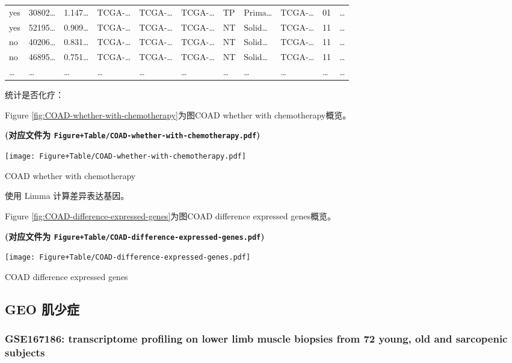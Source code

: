 \documentclass[
]{article}
\begin{document}
\begin{longtable}[]{@{}lllllllllll@{}}
yes & 30802\ldots{} & 1.147\ldots{} & TCGA-\ldots{} & TCGA-\ldots{} & TCGA-\ldots{} & TP & Prima\ldots{} & TCGA-\ldots{} & 01 & \ldots{}\tabularnewline
yes & 52195\ldots{} & 0.909\ldots{} & TCGA-\ldots{} & TCGA-\ldots{} & TCGA-\ldots{} & NT & Solid\ldots{} & TCGA-\ldots{} & 11 & \ldots{}\tabularnewline
no & 40206\ldots{} & 0.831\ldots{} & TCGA-\ldots{} & TCGA-\ldots{} & TCGA-\ldots{} & NT & Solid\ldots{} & TCGA-\ldots{} & 11 & \ldots{}\tabularnewline
no & 46895\ldots{} & 0.751\ldots{} & TCGA-\ldots{} & TCGA-\ldots{} & TCGA-\ldots{} & NT & Solid\ldots{} & TCGA-\ldots{} & 11 & \ldots{}\tabularnewline
\ldots{} & \ldots{} & \ldots{} & \ldots{} & \ldots{} & \ldots{} & \ldots{} & \ldots{} & \ldots{} & \ldots{} & \ldots{}\tabularnewline
\bottomrule
\end{longtable}

统计是否化疗：

Figure \ref{fig:COAD-whether-with-chemotherapy}为图COAD whether with chemotherapy概览。

\textbf{(对应文件为 \texttt{Figure+Table/COAD-whether-with-chemotherapy.pdf})}

\def\@captype{figure}
\begin{center}
\texttt{[image: Figure+Table/COAD-whether-with-chemotherapy.pdf]}
\caption{COAD whether with chemotherapy}\label{fig:COAD-whether-with-chemotherapy}
\end{center}

使用 Limma 计算差异表达基因。

Figure \ref{fig:COAD-difference-expressed-genes}为图COAD difference expressed genes概览。

\textbf{(对应文件为 \texttt{Figure+Table/COAD-difference-expressed-genes.pdf})}

\def\@captype{figure}
\begin{center}
\texttt{[image: Figure+Table/COAD-difference-expressed-genes.pdf]}
\caption{COAD difference expressed genes}\label{fig:COAD-difference-expressed-genes}
\end{center}

\hypertarget{geo-ux808cux5c11ux75c7}{%
\subsection{GEO 肌少症}\label{geo-ux808cux5c11ux75c7}}

\hypertarget{gse167186-transcriptome-profiling-on-lower-limb-muscle-biopsies-from-72-young-old-and-sarcopenic-subjects}{%
\subsubsection{GSE167186: transcriptome profiling on lower limb muscle biopsies from 72 young, old and sarcopenic subjects}\label{gse167186-transcriptome-profiling-on-lower-limb-muscle-biopsies-from-72-young-old-and-sarcopenic-subjects}}
\end{document}
